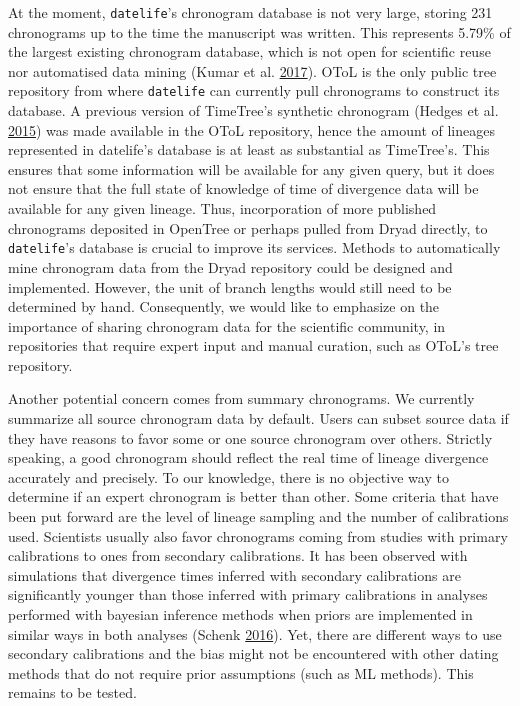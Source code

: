 \documentclass[]{article}
\begin{document}
At the moment, \texttt{datelife}'s chronogram database is not very large, storing 231 chronograms up to the time the manuscript was written. This represents 5.79\% of the largest existing chronogram database, which is not open for scientific reuse nor automatised data mining (Kumar et al. \protect\hyperlink{ref-Kumar2017}{2017}). OToL is the only public tree repository from where \texttt{datelife} can currently pull chronograms to construct its database.
A previous version of TimeTree's synthetic chronogram (Hedges et al. \protect\hyperlink{ref-Hedges2015}{2015}) was made available in the OToL repository, hence the amount of lineages represented in datelife's database is at least as substantial as TimeTree's.
This ensures that some information will be available for any given query, but it does not ensure that the full state of knowledge of time of divergence data will be available for any given lineage.
Thus, incorporation of more published chronograms deposited in OpenTree or perhaps pulled from Dryad directly, to \texttt{datelife}'s database is crucial to improve its services.
Methods to automatically mine chronogram data from the Dryad repository could be designed and implemented. However, the unit of branch lengths would still need to be determined by hand.
Consequently, we would like to emphasize on the importance of sharing chronogram data for the scientific community, in repositories that require expert input and manual curation, such as OToL's tree repository.

Another potential concern comes from summary chronograms. We currently summarize all source chronogram data by default. Users can subset source data if they have reasons to favor some or one source chronogram over others. Strictly speaking, a good chronogram should reflect the real time of lineage divergence accurately and precisely. To our knowledge, there is no objective way to determine if an expert chronogram is better than other. Some criteria that have been put forward are the level of lineage sampling and the number of calibrations used. Scientists usually also favor chronograms coming from studies with primary calibrations to ones from secondary calibrations. It has been observed with simulations that divergence times inferred with secondary calibrations are significantly younger than those inferred with primary calibrations in analyses performed with bayesian inference methods when priors are implemented in similar ways in both analyses (Schenk \protect\hyperlink{ref-schenk2016sec}{2016}). Yet, there are different ways to use secondary calibrations and the bias might not be encountered with other dating methods that do not require prior assumptions (such as ML methods). This remains to be tested.
\end{document}
